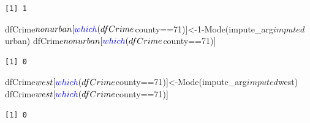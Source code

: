 \documentclass[]{article}
\newenvironment{Shaded}{}{}
\newcommand{\DecValTok}[1]{#1}
\newcommand{\KeywordTok}[1]{\textcolor[rgb]{0.00,0.00,1.00}{#1}}
\newcommand{\NormalTok}[1]{#1}
\newcommand{\OperatorTok}[1]{#1}
\begin{document}
\begin{verbatim}
[1] 1
\end{verbatim}

\begin{Shaded}
\begin{Highlighting}[]
\NormalTok{dfCrime}\OperatorTok{$}\NormalTok{nonurban[}\KeywordTok{which}\NormalTok{(dfCrime}\OperatorTok{$}\NormalTok{county}\OperatorTok{==}\DecValTok{71}\NormalTok{)]<-}\DecValTok{1}\OperatorTok{-}\KeywordTok{Mode}\NormalTok{(impute_arg}\OperatorTok{$}\NormalTok{imputed}\OperatorTok{$}\NormalTok{urban)}
\NormalTok{dfCrime}\OperatorTok{$}\NormalTok{nonurban[}\KeywordTok{which}\NormalTok{(dfCrime}\OperatorTok{$}\NormalTok{county}\OperatorTok{==}\DecValTok{71}\NormalTok{)]}
\end{Highlighting}
\end{Shaded}

\begin{verbatim}
[1] 0
\end{verbatim}

\begin{Shaded}
\begin{Highlighting}[]
\NormalTok{dfCrime}\OperatorTok{$}\NormalTok{west[}\KeywordTok{which}\NormalTok{(dfCrime}\OperatorTok{$}\NormalTok{county}\OperatorTok{==}\DecValTok{71}\NormalTok{)]<-}\KeywordTok{Mode}\NormalTok{(impute_arg}\OperatorTok{$}\NormalTok{imputed}\OperatorTok{$}\NormalTok{west)}
\NormalTok{dfCrime}\OperatorTok{$}\NormalTok{west[}\KeywordTok{which}\NormalTok{(dfCrime}\OperatorTok{$}\NormalTok{county}\OperatorTok{==}\DecValTok{71}\NormalTok{)]}
\end{Highlighting}
\end{Shaded}

\begin{verbatim}
[1] 0
\end{verbatim}
\end{document}
